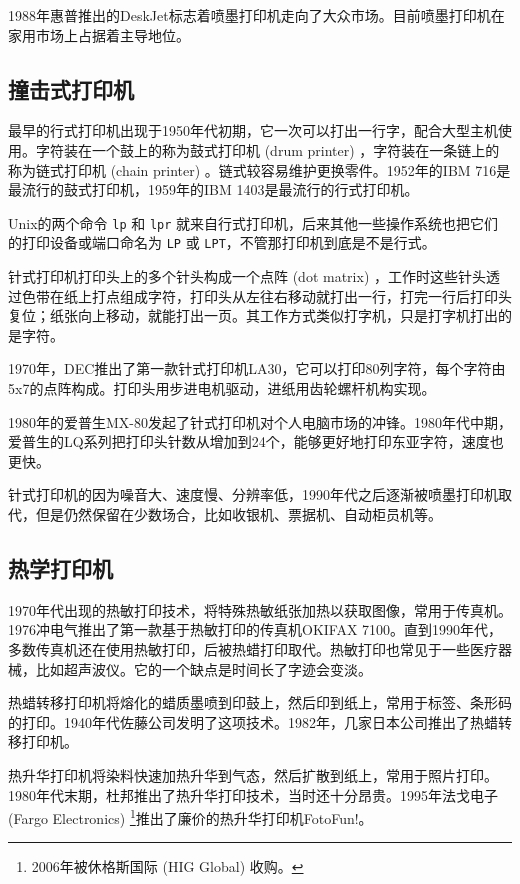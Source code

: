 1988年惠普推出的DeskJet标志着喷墨打印机走向了大众市场。目前喷墨打印机在家用市场上占据着主导地位。

\subsection{撞击式打印机}

最早的行式打印机出现于1950年代初期，它一次可以打出一行字，配合大型主机使用。字符装在一个鼓上的称为鼓式打印机 (drum printer) ，字符装在一条链上的称为链式打印机 (chain printer) 。链式较容易维护更换零件。1952年的IBM 716是最流行的鼓式打印机，1959年的IBM 1403是最流行的行式打印机。

Unix的两个命令 \texttt{lp} 和 \texttt{lpr} 就来自行式打印机，后来其他一些操作系统也把它们的打印设备或端口命名为 \texttt{LP} 或 \texttt{LPT}，不管那打印机到底是不是行式。

针式打印机打印头上的多个针头构成一个点阵 (dot matrix) ，工作时这些针头透过色带在纸上打点组成字符，打印头从左往右移动就打出一行，打完一行后打印头复位；纸张向上移动，就能打出一页。其工作方式类似打字机，只是打字机打出的是字符。

1970年，DEC\indexDEC{}推出了第一款针式打印机LA30，它可以打印80列字符，每个字符由5x7的点阵构成。打印头用步进电机驱动，进纸用齿轮螺杆机构实现。

1980年的爱普生MX-80发起了针式打印机对个人电脑市场的冲锋。1980年代中期，爱普生的LQ系列把打印头针数从增加到24个，能够更好地打印东亚字符，速度也更快。

针式打印机的因为噪音大、速度慢、分辨率低，1990年代之后逐渐被喷墨打印机取代，但是仍然保留在少数场合，比如收银机、票据机、自动柜员机等。

\subsection{热学打印机}

1970年代出现的热敏打印技术，将特殊热敏纸张加热以获取图像，常用于传真机。1976冲电气推出了第一款基于热敏打印的传真机OKIFAX 7100。直到1990年代，多数传真机还在使用热敏打印，后被热蜡打印取代。热敏打印也常见于一些医疗器械，比如超声波仪。它的一个缺点是时间长了字迹会变淡。

热蜡转移打印机将熔化的蜡质墨喷到印鼓上，然后印到纸上，常用于标签、条形码的打印。1940年代佐藤公司\indexSATO{}发明了这项技术。1982年，几家日本公司推出了热蜡转移打印机。

热升华打印机将染料快速加热升华到气态，然后扩散到纸上，常用于照片打印。1980年代末期，杜邦\indexDupont{}推出了热升华打印技术，当时还十分昂贵。1995年法戈电子 (Fargo Electronics)\indexFargo{} \footnote{2006年被休格斯国际 (HIG Global) 收购。}推出了廉价的热升华打印机FotoFun!。

